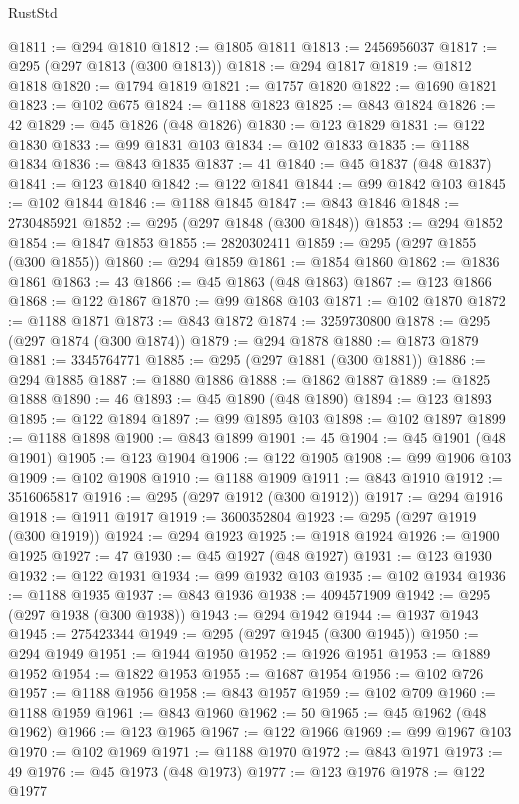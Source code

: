 \begin{lexlean}{RustStd}
\begin{coremodule}
@1811 := @294 @1810
@1812 := @1805 @1811
@1813 := 2456956037
@1817 := @295 (@297 @1813 (@300 @1813))
@1818 := @294 @1817
@1819 := @1812 @1818
@1820 := @1794 @1819
@1821 := @1757 @1820
@1822 := @1690 @1821
@1823 := @102 @675
@1824 := @1188 @1823
@1825 := @843 @1824
@1826 := 42
@1829 := @45 @1826 (@48 @1826)
@1830 := @123 @1829
@1831 := @122 @1830
@1833 := @99 @1831 @103
@1834 := @102 @1833
@1835 := @1188 @1834
@1836 := @843 @1835
@1837 := 41
@1840 := @45 @1837 (@48 @1837)
@1841 := @123 @1840
@1842 := @122 @1841
@1844 := @99 @1842 @103
@1845 := @102 @1844
@1846 := @1188 @1845
@1847 := @843 @1846
@1848 := 2730485921
@1852 := @295 (@297 @1848 (@300 @1848))
@1853 := @294 @1852
@1854 := @1847 @1853
@1855 := 2820302411
@1859 := @295 (@297 @1855 (@300 @1855))
@1860 := @294 @1859
@1861 := @1854 @1860
@1862 := @1836 @1861
@1863 := 43
@1866 := @45 @1863 (@48 @1863)
@1867 := @123 @1866
@1868 := @122 @1867
@1870 := @99 @1868 @103
@1871 := @102 @1870
@1872 := @1188 @1871
@1873 := @843 @1872
@1874 := 3259730800
@1878 := @295 (@297 @1874 (@300 @1874))
@1879 := @294 @1878
@1880 := @1873 @1879
@1881 := 3345764771
@1885 := @295 (@297 @1881 (@300 @1881))
@1886 := @294 @1885
@1887 := @1880 @1886
@1888 := @1862 @1887
@1889 := @1825 @1888
@1890 := 46
@1893 := @45 @1890 (@48 @1890)
@1894 := @123 @1893
@1895 := @122 @1894
@1897 := @99 @1895 @103
@1898 := @102 @1897
@1899 := @1188 @1898
@1900 := @843 @1899
@1901 := 45
@1904 := @45 @1901 (@48 @1901)
@1905 := @123 @1904
@1906 := @122 @1905
@1908 := @99 @1906 @103
@1909 := @102 @1908
@1910 := @1188 @1909
@1911 := @843 @1910
@1912 := 3516065817
@1916 := @295 (@297 @1912 (@300 @1912))
@1917 := @294 @1916
@1918 := @1911 @1917
@1919 := 3600352804
@1923 := @295 (@297 @1919 (@300 @1919))
@1924 := @294 @1923
@1925 := @1918 @1924
@1926 := @1900 @1925
@1927 := 47
@1930 := @45 @1927 (@48 @1927)
@1931 := @123 @1930
@1932 := @122 @1931
@1934 := @99 @1932 @103
@1935 := @102 @1934
@1936 := @1188 @1935
@1937 := @843 @1936
@1938 := 4094571909
@1942 := @295 (@297 @1938 (@300 @1938))
@1943 := @294 @1942
@1944 := @1937 @1943
@1945 := 275423344
@1949 := @295 (@297 @1945 (@300 @1945))
@1950 := @294 @1949
@1951 := @1944 @1950
@1952 := @1926 @1951
@1953 := @1889 @1952
@1954 := @1822 @1953
@1955 := @1687 @1954
@1956 := @102 @726
@1957 := @1188 @1956
@1958 := @843 @1957
@1959 := @102 @709
@1960 := @1188 @1959
@1961 := @843 @1960
@1962 := 50
@1965 := @45 @1962 (@48 @1962)
@1966 := @123 @1965
@1967 := @122 @1966
@1969 := @99 @1967 @103
@1970 := @102 @1969
@1971 := @1188 @1970
@1972 := @843 @1971
@1973 := 49
@1976 := @45 @1973 (@48 @1973)
@1977 := @123 @1976
@1978 := @122 @1977

\end{coremodule}
\end{lexlean}
